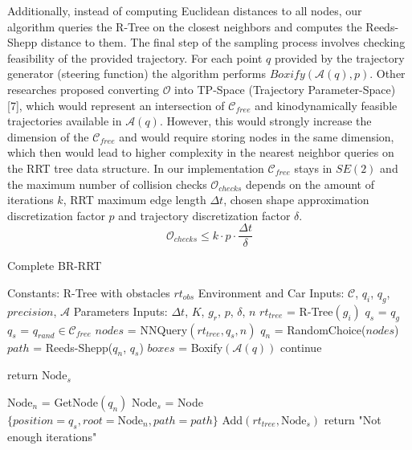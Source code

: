 \documentclass[a4paper,12pt]{article}
\DeclareRobustCommand{\[}{\begin{equation}}
\DeclareRobustCommand{\]}{\end{equation}}
\numberwithin{equation}{section}
\numberwithin{algorithm}{section}
\begin{document}
Additionally, instead of computing Euclidean distances to all nodes, our algorithm queries the R-Tree on the closest neighbors and computes the Reeds-Shepp distance to them.
The final step of the sampling process involves checking feasibility of the provided trajectory.
For each point $q$ provided by the trajectory generator (steering function) the algorithm performs $Boxify(\mathcal{A}(q), p)$.
Other researches proposed converting $\mathcal{O}$ into TP-Space (Trajectory Parameter-Space) [7], which would represent an intersection of $\mathcal{C}_{free}$ and 
kinodynamically feasible trajectories available in $\mathcal{A}(q)$. However, this would strongly increase the dimension of the $\mathcal{C}_{free}$ and would require
storing nodes in the same dimension, which then would lead to higher complexity in the nearest neighbor queries on the RRT tree data structure.
In our implementation $\mathcal{C}_{free}$ stays in $SE(2)$ and the maximum number of collision checks $\mathcal{O}_{checks}$ depends on the amount of iterations $k$, RRT maximum edge length $\Delta{t}$, chosen shape approximation discretization factor $p$ and trajectory discretization factor $\delta$.
\[
\mathcal{O}_{checks} \leq k\cdot p\cdot \frac{\Delta{t}}{\delta}\label{eq:max_coll_checks}
\]

\begin{algorithm}[H]
    \caption{Complete BR-RRT}
    \begin{algorithmic}[1]
    \State Constants: R-Tree with obstacles $rt_{obs}$
    \State Environment and Car Inputs: $\mathcal{C}$, $q_i$, $q_g$, $precision$, $\mathcal{A}$
    \State Parameters Inputs: $\Delta{t}$, $K$, $g_r$, $p$, $\delta$, $n$
    \State $rt_{tree}$ = R-Tree$(g_i)$
            \State $q_s$ = $q_g$
        \Else
            \State $q_s$ = $q_{rand}\in\mathcal{C}_{free}$
        \EndIf
        \State $nodes$ = NNQuery$(rt_{tree}, q_s, n)$
        \State $q_n$ = RandomChoice($nodes$)
        \State $path$ = Reeds-Shepp($q_n$, $q_s$)
            $boxes$ = Boxify$(\mathcal{A}(q))$
                    \State continue
                \EndIf
            \EndFor
        \EndFor

            \State return $\text{Node}_s$
        \EndIf        

        \State $\text{Node}_n$ = GetNode$(q_n)$
        \State $\text{Node}_s$ = Node$\{position=q_s, root=\text{Node}_n, path=path\}$
        \State Add$(rt_{tree}, \text{Node}_s)$
    \EndFor
    \State return "Not enough iterations"
    \end{algorithmic}
\end{algorithm}
\end{document}
